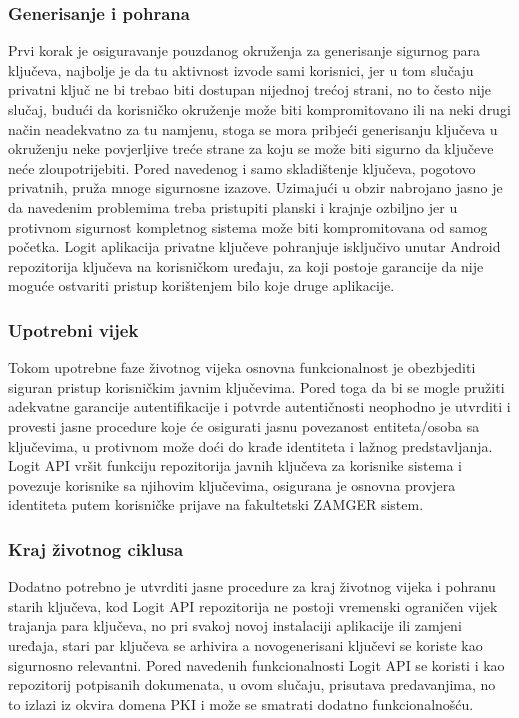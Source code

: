 \subsubsection{Generisanje i pohrana}
Prvi korak je osiguravanje pouzdanog okruženja za generisanje sigurnog para ključeva, najbolje je da tu aktivnost izvode sami korisnici, jer u tom slučaju privatni ključ ne bi trebao biti dostupan nijednoj trećoj strani, no to često nije slučaj, budući da korisničko okruženje može biti kompromitovano ili na neki drugi način neadekvatno za tu namjenu, stoga se mora pribjeći generisanju ključeva u okruženju neke povjerljive treće strane za koju se može biti sigurno da ključeve neće zloupotrijebiti. Pored navedenog i samo skladištenje ključeva, pogotovo privatnih, pruža mnoge sigurnosne izazove. Uzimajući u obzir nabrojano jasno je da navedenim problemima treba pristupiti planski i krajnje ozbiljno jer u protivnom sigurnost kompletnog sistema može biti kompromitovana od samog početka. Logit aplikacija privatne ključeve pohranjuje isključivo unutar Android repozitorija ključeva na korisničkom uređaju, za koji postoje garancije da nije moguće ostvariti pristup korištenjem bilo koje druge aplikacije.

\subsubsection{Upotrebni vijek}
Tokom upotrebne faze životnog vijeka osnovna funkcionalnost je obezbjediti siguran pristup korisničkim javnim ključevima. Pored toga da bi se mogle pružiti adekvatne garancije autentifikacije i potvrde autentičnosti neophodno je utvrditi i provesti jasne procedure koje će osigurati jasnu povezanost entiteta/osoba sa ključevima, u protivnom može doći do krađe identiteta i lažnog predstavljanja. Logit API vršit funkciju repozitorija javnih ključeva za korisnike sistema i povezuje korisnike sa njihovim ključevima, osigurana je osnovna provjera identiteta putem korisničke prijave na fakultetski ZAMGER sistem.

\subsubsection{Kraj životnog ciklusa}
Dodatno potrebno je utvrditi jasne procedure za kraj životnog vijeka i pohranu starih ključeva, kod Logit API repozitorija ne postoji vremenski ograničen vijek trajanja para ključeva, no pri svakoj novoj instalaciji aplikacije ili zamjeni uređaja, stari par ključeva se arhivira a novogenerisani ključevi se koriste kao sigurnosno relevantni. Pored navedenih funkcionalnosti Logit API se koristi i kao repozitorij potpisanih dokumenata, u ovom slučaju, prisutava predavanjima, no to izlazi iz okvira domena PKI i može se smatrati dodatno funkcionalnošću.

